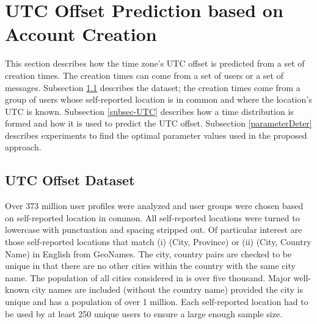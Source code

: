 \section{UTC Offset Prediction based on Account Creation} \label{sec3}

This section describes how the time zone's UTC offset is predicted from a set of creation times. The creation times can come from a set of users or a set of messages. Subsection \ref{subsec-UTCdata} describes the dataset; the creation times come from a group of users whose self-reported location is in common and where the location's UTC is known. Subsection \ref{subsec-UTC} describes %
how a time distribution is formed and how it is used to predict the UTC offset. Subsection \ref{parameterDeter} describes experiments %
to find the optimal parameter values used in the proposed approach.


\subsection{UTC Offset Dataset} \label{subsec-UTCdata}

Over 373 million user profiles were analyzed and user groups were chosen based on self-reported location in common. All self-reported locations were turned to lowercase with punctuation and spacing stripped out. Of particular interest are those self-reported locations that match (i) (City, Province) or (ii) (City, Country Name) in English from GeoNames. The city, country pairs are checked to be unique in that there are no other cities within the country with the same city name. The population of all cities considered in is over five thousand. Major well-known city names are included (without the country name) provided the city is unique and has a population of over 1 million. Each self-reported location had to be used by at least 250 unique users to ensure a large enough sample size. %
 
 
